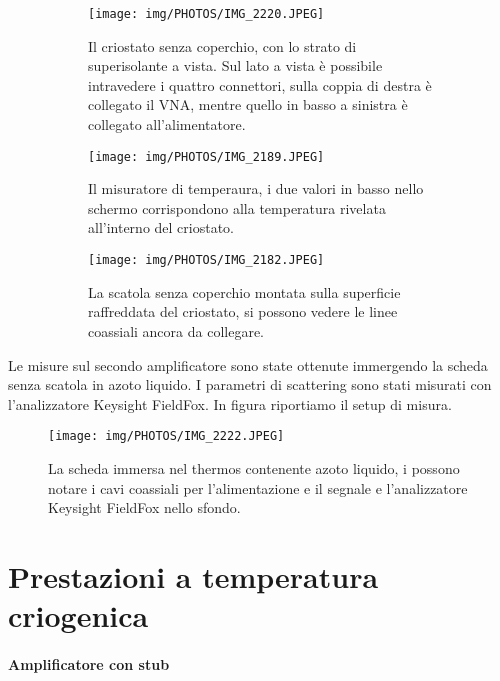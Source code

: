 \documentclass[12pt,oneside]{book}
\begin{document}
\begin{figure}[!htbp]
    \centering
    \begin{subfigure}[t]{0.48\textwidth}
        \centering
        \texttt{[image: img/PHOTOS/IMG\_2220.JPEG]}
        \caption{Il criostato senza coperchio, con lo strato di superisolante a vista. Sul lato a vista è possibile intravedere i quattro connettori, sulla coppia di destra è collegato il VNA, mentre quello in basso a sinistra è collegato all'alimentatore.}
    \end{subfigure}
    \hfill
    \begin{subfigure}[t]{0.48\textwidth}
        \centering
        \texttt{[image: img/PHOTOS/IMG\_2189.JPEG]}
        \caption{Il misuratore di temperaura, i due valori in basso nello schermo corrispondono alla temperatura rivelata all'interno del criostato.}
    \end{subfigure}
    \hfill
    \begin{subfigure}[t]{0.7\textwidth}
        \centering
        \texttt{[image: img/PHOTOS/IMG\_2182.JPEG]}
        \caption{La scatola senza coperchio montata sulla superficie raffreddata del criostato, si possono vedere le linee coassiali ancora da collegare.}
    \end{subfigure}
    \caption{}
    \label{setup_cryo}
\end{figure}


Le misure sul secondo amplificatore sono state ottenute immergendo la scheda senza scatola in azoto liquido. I parametri di scattering sono stati misurati con l'analizzatore Keysight FieldFox. In figura riportiamo il setup di misura.

\begin{figure}[!htbp]
    \centering
        
    \texttt{[image: img/PHOTOS/IMG\_2222.JPEG]}
    \caption{La scheda immersa nel thermos contenente azoto liquido, i possono notare i cavi coassiali per l'alimentazione e il segnale e l'analizzatore Keysight FieldFox nello sfondo.}
    \label{ln2_setup}
\end{figure}


\section{Prestazioni a temperatura criogenica}

\paragraph{Amplificatore con stub}
\end{document}
